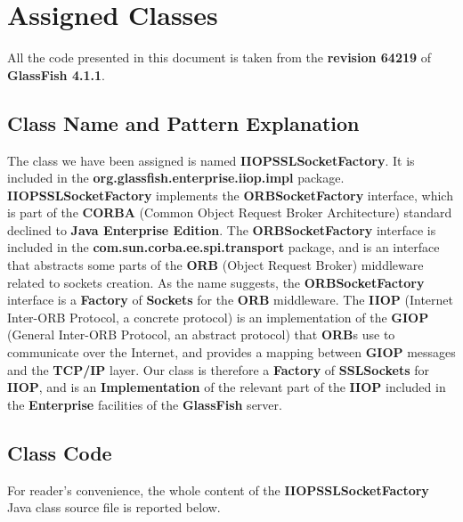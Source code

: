 \section{Assigned Classes}
All the code presented in this document is taken from the \textbf{revision 64219} of \textbf{GlassFish 4.1.1}.

\subsection{Class Name and Pattern Explanation}
The class we have been assigned is named \textbf{IIOPSSLSocketFactory}.
It is included in the \textbf{org.glassfish.enterprise.iiop.impl} package.
\textbf{IIOPSSLSocketFactory} implements the \textbf{ORBSocketFactory} interface, which is part of the \textbf{CORBA} (Common Object Request Broker Architecture) standard declined to \textbf{Java Enterprise Edition}.
The \textbf{ORBSocketFactory} interface is included in the \textbf{com.sun.corba.ee.spi.transport} package, and is an interface that abstracts some parts of the \textbf{ORB} (Object Request Broker) middleware related to sockets creation.
As the name suggests, the \textbf{ORBSocketFactory} interface is a \textbf{Factory} of \textbf{Sockets} for the \textbf{ORB} middleware.
The \textbf{IIOP} (Internet Inter-ORB Protocol, a concrete protocol) is an implementation of the \textbf{GIOP} (General Inter-ORB Protocol, an abstract protocol) that \textbf{ORB}s use to communicate over the Internet, and provides a mapping between \textbf{GIOP} messages and the \textbf{TCP/IP} layer.
Our class is therefore a \textbf{Factory} of \textbf{SSLSockets} for \textbf{IIOP}, and is an \textbf{Implementation} of the relevant part of the \textbf{IIOP} included in the \textbf{Enterprise} facilities of the \textbf{GlassFish} server.

\subsection{Class Code}
For reader's convenience, the whole content of the \textbf{IIOPSSLSocketFactory} Java class source file is reported below.
